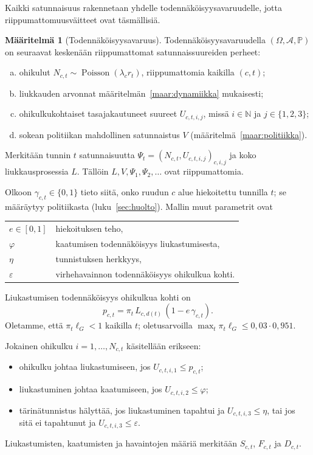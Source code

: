 \documentclass[11pt,a4paper]{article}
\theoremstyle{plain}
\theoremstyle{definition}
\newtheorem{maaritelma}{Määritelmä}
\theoremstyle{remark}
\renewcommand{\P}{\mathbb{P}}
\newcommand{\cA}{\mathcal{A}}
\newcommand{\1}{\mathbf{1}}
\newcommand{\Poi}{\operatorname{Poisson}}
\begin{document}
Kaikki satunnaisuus rakennetaan yhdelle todennäköisyysavaruudelle, jotta
riippumattomuusväitteet ovat täsmällisiä.

\begin{maaritelma}[Todennäköisyysavaruus]\label{maar:avaruus}
Todennäköisyysavaruudella $(\Omega, \cA, \P)$ on seuraavat keskenään
riippumattomat satunnaissuureiden perheet:
\begin{enumerate}[(a)]
  \item ohikulut $N_{c,t} \sim \Poi(\lambda_c r_t)$, riippumattomia kaikilla $(c,t)$;
  \item liukkauden arvonnat määritelmän~\ref{maar:dynamiikka} mukaisesti;
  \item ohikulkukohtaiset tasajakautuneet suureet $U_{c,t,i,j}$, missä
  $i \in \mathbb{N}$ ja $j \in \{1, 2, 3\}$;
  \item sokean politiikan mahdollinen satunnaistus $V$ (määritelmä~\ref{maar:politiikka}).
\end{enumerate}
Merkitään tunnin $t$ satunnaisuutta $\Psi_t = (N_{c,t}, U_{c,t,i,j})_{c, i, j}$
ja koko liukkausprosessia $L$. Tällöin $L, V, \Psi_1, \Psi_2, \dots$ ovat
riippumattomia.
\end{maaritelma}

Olkoon $\gamma_{c,t} \in \{0,1\}$ tieto siitä, onko ruudun $c$ alue
hiekoitettu tunnilla $t$; se määräytyy politiikasta
(luku~\ref{sec:huolto}). Mallin muut parametrit ovat
\begin{center}
\begin{tabular}{@{}ll@{}}
$e \in [0,1]$ & hiekoituksen teho, \\
$\varphi$ & kaatumisen todennäköisyys liukastumisesta, \\
$\eta$ & tunnistuksen herkkyys, \\
$\varepsilon$ & virhehavainnon todennäköisyys ohikulkua kohti.
\end{tabular}
\end{center}

Liukastumisen todennäköisyys ohikulkua kohti on
\begin{equation}\label{eq:p}
  p_{c,t} = \pi_t\, L_{c,d(t)}\, (1 - e\,\gamma_{c,t}).
\end{equation}
Oletamme, että $\pi_t \ell_G < 1$ kaikilla $t$; oletusarvoilla
$\max_t \pi_t \ell_G \le 0{,}03 \cdot 0{,}951$.

Jokainen ohikulku $i = 1, \dots, N_{c,t}$ käsitellään erikseen:
\begin{itemize}
  \item ohikulku johtaa liukastumiseen, jos $U_{c,t,i,1} \le p_{c,t}$;
  \item liukastuminen johtaa kaatumiseen, jos $U_{c,t,i,2} \le \varphi$;
  \item tärinätunnistus hälyttää, jos liukastuminen tapahtui ja
  $U_{c,t,i,3} \le \eta$, tai jos sitä ei tapahtunut ja $U_{c,t,i,3} \le \varepsilon$.
\end{itemize}
Liukastumisten, kaatumisten ja havaintojen määriä merkitään $S_{c,t}$,
$F_{c,t}$ ja $D_{c,t}$.
\end{document}

